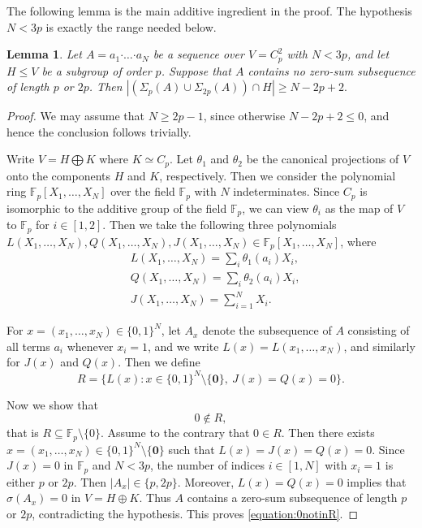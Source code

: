\documentclass[a4paper, 12pt]{article}
\newtheorem{lemma}[theorem]{Lemma}
\theoremstyle{definition}
\begin{document}
The following lemma is the main additive ingredient in the proof.
The hypothesis $N<3p$ is exactly the range needed below.



\begin{lemma}\label{lemma:relative}
Let
$A=a_1\boldsymbol{\cdot}\ldots\boldsymbol{\cdot}a_N$
be a sequence over $V=C_p^2$ with $N<3p$, and let $H\le V$ be a
subgroup of order $p$. Suppose that $A$ contains no zero-sum
subsequence of length $p$ or $2p$. Then
$\left|\left(\Sigma_p(A)\cup\Sigma_{2p}(A)\right)\cap H\right|
\ge N-2p+2.$
\end{lemma}

\begin{proof} We may assume that $N\ge 2p-1$, since otherwise
$N-2p+2\leq0$, and hence the conclusion follows trivially.

Write $V=H\bigoplus K$ where $K\simeq C_p$. Let $\theta_1$ and $\theta_2$ be the canonical projections of $V$ onto the components $H$ and $K$, respectively.  Then we consider the polynomial ring $\mathbb F_p[X_1,\ldots,X_{N}]$ over the field $\mathbb F_p$ with $N$ indeterminates. Since $C_p$ is isomorphic to the additive group of the field $\mathbb{F}_p$, we can view $\theta_i$ as the map of $V$ to $\mathbb{F}_p$ for $i\in [1,2]$. Then we take the following three polynomials $L(X_1,\ldots,X_N), Q(X_1,\ldots,X_N), J(X_1,\ldots,X_N)\in \mathbb F_p[X_1,\ldots,X_{N}]$, where
$$\begin{aligned}
&L(X_1,\ldots,X_N)=\sum_i\theta_1(a_i)X_i,  \\ 
&Q(X_1,\ldots,X_N)=\sum_i \theta_2(a_i)X_i, \\  
&J(X_1,\ldots,X_N)=\sum_{i=1}^N X_i. \end{aligned}
$$


For $x=(x_1,\ldots,x_N)\in\{0,1\}^N$, let $A_x$ denote the
subsequence of $A$ consisting of all terms $a_i$ whenever $x_i=1$, and we write
$L(x)=L(x_1,\ldots,x_N)$, and similarly for $J(x)$ and $Q(x)$.
Then we define
\begin{equation}\label{equation:Rdefinition}
R=\{L(x):x\in\{0,1\}^N\setminus\{\mathbf 0\},
      \ J(x)=Q(x)=0\}.
\end{equation}

Now we show that
\begin{equation}\label{equation:0notinR}
0\notin R,
\end{equation}
that is $R\subseteq\mathbb F_p\setminus \{0\}$.
Assume to the contrary that $0\in R$. Then there exists
$x=(x_1,\ldots,x_N)\in\{0,1\}^N\setminus\{\mathbf 0\}$ such that
$L(x)=J(x)=Q(x)=0$. Since $J(x)=0$ in $\mathbb F_p$ and $N<3p$,
the number of indices $i\in [1,N]$ with $x_i=1$ is either $p$ or $2p$.
Then $|A_x|\in\{p,2p\}$. Moreover,
$L(x)=Q(x)=0$ implies that
$\sigma(A_x)=0$ in $V=H\oplus K$. Thus $A$ contains a zero-sum
subsequence of length $p$ or $2p$, contradicting the hypothesis.
This proves \eqref{equation:0notinR}.





\end{proof}
\end{document}
